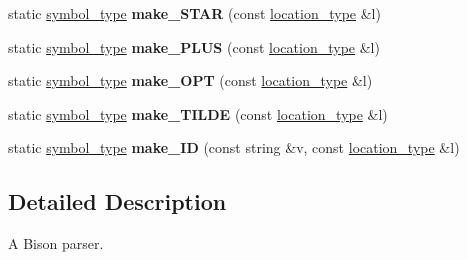 \begin{DoxyCompactItemize}
\item 
static \hyperlink{classyy_1_1spec__parser_ab8cb3674e6a9b60026cbd40466ea149b}{symbol\+\_\+type} {\bfseries make\+\_\+\+S\+T\+AR} (const \hyperlink{classyy_1_1spec__parser_aeb5b1e66f65306eca737db5dfa61590d}{location\+\_\+type} \&l)\hypertarget{classyy_1_1spec__parser_a18fe7e4752e24eaf7860209e9048167d}{}\label{classyy_1_1spec__parser_a18fe7e4752e24eaf7860209e9048167d}

\item 
static \hyperlink{classyy_1_1spec__parser_ab8cb3674e6a9b60026cbd40466ea149b}{symbol\+\_\+type} {\bfseries make\+\_\+\+P\+L\+US} (const \hyperlink{classyy_1_1spec__parser_aeb5b1e66f65306eca737db5dfa61590d}{location\+\_\+type} \&l)\hypertarget{classyy_1_1spec__parser_ac0447fbe839c2291951026f214b4e124}{}\label{classyy_1_1spec__parser_ac0447fbe839c2291951026f214b4e124}

\item 
static \hyperlink{classyy_1_1spec__parser_ab8cb3674e6a9b60026cbd40466ea149b}{symbol\+\_\+type} {\bfseries make\+\_\+\+O\+PT} (const \hyperlink{classyy_1_1spec__parser_aeb5b1e66f65306eca737db5dfa61590d}{location\+\_\+type} \&l)\hypertarget{classyy_1_1spec__parser_ade851d4049c7028b4e3f3d56027d84f4}{}\label{classyy_1_1spec__parser_ade851d4049c7028b4e3f3d56027d84f4}

\item 
static \hyperlink{classyy_1_1spec__parser_ab8cb3674e6a9b60026cbd40466ea149b}{symbol\+\_\+type} {\bfseries make\+\_\+\+T\+I\+L\+DE} (const \hyperlink{classyy_1_1spec__parser_aeb5b1e66f65306eca737db5dfa61590d}{location\+\_\+type} \&l)\hypertarget{classyy_1_1spec__parser_adc41647da9da889f9e0168f5146fc688}{}\label{classyy_1_1spec__parser_adc41647da9da889f9e0168f5146fc688}

\item 
static \hyperlink{classyy_1_1spec__parser_ab8cb3674e6a9b60026cbd40466ea149b}{symbol\+\_\+type} {\bfseries make\+\_\+\+ID} (const string \&v, const \hyperlink{classyy_1_1spec__parser_aeb5b1e66f65306eca737db5dfa61590d}{location\+\_\+type} \&l)\hypertarget{classyy_1_1spec__parser_a7f31699c8b4b33e975b0cffd0ee16237}{}\label{classyy_1_1spec__parser_a7f31699c8b4b33e975b0cffd0ee16237}

\end{DoxyCompactItemize}


\subsection{Detailed Description}
A Bison parser. 

